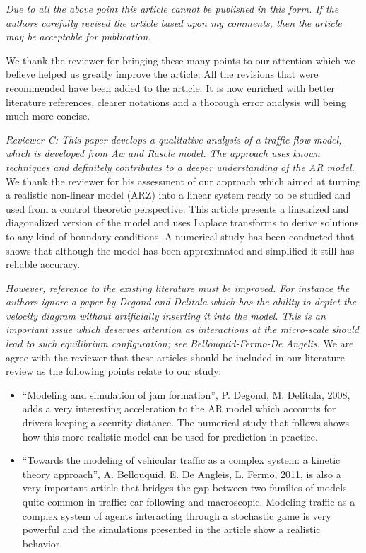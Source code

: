 \documentclass{article}
\begin{document}
\bigskip{}

\emph{
Due to all the above point this article cannot be published in this form. If the authors carefully revised the article based upon my comments, then the article may be acceptable for publication.
}

We thank the reviewer for bringing these many points to our attention which we believe helped us greatly improve the article. All the revisions that were recommended have been added to the article. It is now enriched with better literature references, clearer notations and a thorough error analysis will being much more concise.


\newpage

\emph{
Reviewer C: This paper develops a qualitative analysis of a traffic flow model, which is developed from Aw and Rascle model. The approach uses known techniques and definitely contributes to a deeper understanding of the AR model.
}
We thank the reviewer for his assessment of our approach which aimed at turning a realistic non-linear model (ARZ) into a linear system ready to be studied and used from a control theoretic perspective. This article presents a linearized and diagonalized version of the model and uses Laplace transforms to derive solutions to any kind of boundary conditions. A numerical study has been conducted that shows that although the model has been approximated and simplified it still has reliable accuracy.

\bigskip{}

\emph{
However, reference to the existing literature must be improved. For instance the authors ignore a paper by Degond and Delitala which has the ability to depict the velocity diagram without artificially inserting it into the model. This is an important issue which deserves attention as interactions at the micro-scale should lead to such equilibrium configuration; see Bellouquid-Fermo-De Angelis.
}
We are agree with the reviewer that these articles should be included in our literature review as the following points relate to our study:

\begin{itemize}
\item ``Modeling and simulation of jam formation'', P. Degond, M. Delitala, 2008, adds a very interesting acceleration to the AR model which accounts for drivers keeping a security distance. The numerical study that follows shows how this more realistic model can be used for prediction in practice.
\item ``Towards the modeling of vehicular traffic as a complex system: a kinetic theory approach'', A. Bellouquid, E. De Angleis, L. Fermo, 2011, is also a very important article that bridges the gap between two families of models quite common in traffic: car-following and macroscopic. Modeling traffic as a complex system of agents interacting through a stochastic game is very powerful and the simulations presented in the article show a realistic behavior.
\end{itemize}
\end{document}
